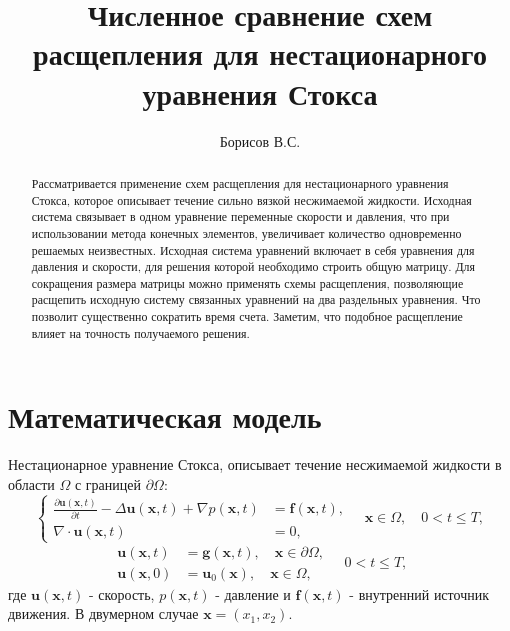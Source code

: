 \documentclass[12pt]{article}
\title{Численное сравнение схем расщепления для нестационарного уравнения Стокса}
\author{Борисов В.С.}
\begin{document}
\maketitle

\begin{abstract}
Рассматривается применение схем расщепления для нестационарного уравнения Стокса, которое описывает течение сильно вязкой несжимаемой жидкости. 
Исходная система связывает в одном уравнение переменные скорости и давления, что при использовании метода конечных элементов, увеличивает количество одновременно решаемых неизвестных. 
Исходная система уравнений включает в себя уравнения для давления и скорости, для решения которой необходимо строить общую матрицу. 
Для сокращения размера матрицы можно применять схемы расщепления, позволяющие расщепить исходную систему связанных уравнений на два раздельных уравнения. Что позволит существенно сократить время счета. Заметим, что подобное расщепление влияет на точность получаемого решения.
\end{abstract}

\section{Математическая модель}
Нестационарное уравнение Стокса, описывает течение несжимаемой жидкости в области $\Omega$ с границей $\partial \Omega$:
\begin{equation}
\left\{
\begin{aligned}
\frac{\partial {\bm u}({\bm x}, t)}{\partial t} -\Delta {\bm u}({\bm x}, t) + \nabla p({\bm x}, t) &= {\bm f}({\bm x}, t), \\
\nabla\cdot{\bm u}({\bm x}, t) &= 0, 
\end{aligned}
\right.
\quad {\bm x} \in \Omega, \quad 0<t \leq T,
\end{equation} 
$$
\begin{aligned}
{\bm u(\bm x, t)} &= {\bm g}({\bm x}, t), \quad {\bm x} \in \partial \Omega,\\
{\bm u(\bm x, 0)} &= {\bm u_0}({\bm x}), \quad {\bm x} \in \Omega,
\end{aligned}
\quad 0<t \leq T,
$$
где ${\bm u}({\bm x}, t)$ - скорость, $p({\bm x}, t)$ - давление и ${\bm f}({\bm x}, t)$ - внутренний источник движения. В двумерном случае ${\bm x}=(x_1, x_2)$.
\end{document}
